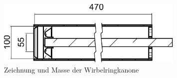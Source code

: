 \begin{figure}
\centering
\includegraphics[width=0.8\textwidth]{papers/wirbelringe/fig/zeichnung.pdf}
\caption{Zeichnung und Masse der Wirbelringkanone \cite{Wirbelringe:3D_modelle} \label{Wirbelringe:fig:zeichnung}}
\end{figure}